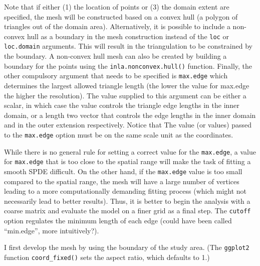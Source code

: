 \documentclass[
]{article}
\begin{document}
Note that if either (1) the location of points or (3) the domain extent
are specified, the mesh will be constructed based on a convex hull (a
polygon of triangles out of the domain area). Alternatively, it is
possible to include a non-convex hull as a boundary in the mesh
construction instead of the \texttt{loc} or \texttt{loc.domain}
arguments. This will result in the triangulation to be constrained by
the boundary. A non-convex hull mesh can also be created by building a
boundary for the points using the \texttt{inla.nonconvex.hull()}
function. Finally, the other compulsory argument that needs to be
specified is \texttt{max.edge} which determines the largest allowed
triangle length (the lower the value for max.edge the higher the
resolution). The value supplied to this argument can be either a scalar,
in which case the value controls the triangle edge lengths in the inner
domain, or a length two vector that controls the edge lengths in the
inner domain and in the outer extension respectively. Notice that The
value (or values) passed to the \texttt{max.edge} option must be on the
same scale unit as the coordinates.

While there is no general rule for setting a correct value for the
\texttt{max.edge}, a value for \texttt{max.edge} that is too close to
the spatial range will make the task of fitting a smooth SPDE difficult.
On the other hand, if the \texttt{max.edge} value is too small compared
to the spatial range, the mesh will have a large number of vertices
leading to a more computationally demanding fitting process (which might
not necessarily lead to better results). Thus, it is better to begin the
analysis with a coarse matrix and evaluate the model on a finer grid as
a final step. The \texttt{cutoff} option regulates the minimum length of
each edge (could have been called ``min.edge'', more intuitively?).

I first develop the mesh by using the boundary of the study area. (The
\texttt{ggplot2} function \texttt{coord\_fixed()} sets the aspect ratio,
which defaults to 1.)
\end{document}
